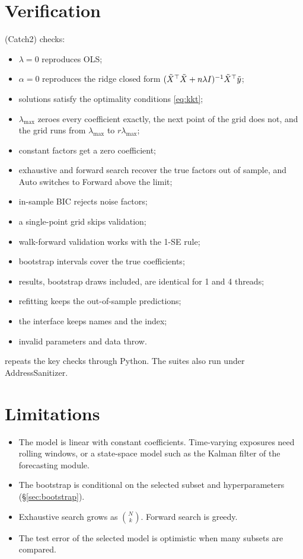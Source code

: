 \documentclass[11pt,a4paper]{article}
\begin{document}
\section{Verification}
 (Catch2) checks:
\begin{itemize}
  \item $\lambda=0$ reproduces OLS;
  \item $\alpha=0$ reproduces the ridge closed form $(\tilde X^\top\tilde X+n\lambda I)^{-1}\tilde X^\top\tilde y$;
  \item solutions satisfy the optimality conditions \eqref{eq:kkt};
  \item $\lambda_{\max}$ zeroes every coefficient exactly, the next point of the grid does
        not, and the grid runs from $\lambda_{\max}$ to $r\lambda_{\max}$;
  \item constant factors get a zero coefficient;
  \item exhaustive and forward search recover the true factors out of sample, and Auto
        switches to Forward above the limit;
  \item in-sample BIC rejects noise factors;
  \item a single-point grid skips validation;
  \item walk-forward validation works with the 1-SE rule;
  \item bootstrap intervals cover the true coefficients;
  \item results, bootstrap draws included, are identical for 1 and 4 threads;
  \item refitting keeps the out-of-sample predictions;
  \item the  interface keeps names and the index;
  \item invalid parameters and data throw.
\end{itemize}
 repeats the key checks through Python.
The suites also run under AddressSanitizer.

\section{Limitations}
\begin{itemize}
  \item The model is linear with constant coefficients. Time-varying exposures need rolling
        windows, or a state-space model such as the Kalman filter of the forecasting module.
  \item The bootstrap is conditional on the selected subset and hyperparameters
        (\S\ref{sec:bootstrap}).
  \item Exhaustive search grows as $\binom Nk$. Forward search is greedy.
  \item The test error of the selected model is optimistic when many subsets are compared.
\end{itemize}
\end{document}
